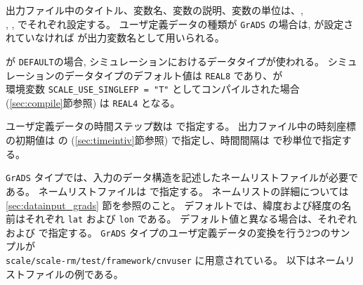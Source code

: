 出力ファイル中のタイトル、変数名、変数の説明、変数の単位は、, \\
, ,  でそれぞれ設定する。
ユーザ定義データの種類が \verb|GrADS| の場合は,  が設定されていなければ  が出力変数名として用いられる。

 が \verb|DEFAULT|の場合, シミュレーションにおけるデータタイプが使われる。
シミュレーションのデータタイプのデフォルト値は \verb|REAL8| であり、\scalerm が \\
環境変数 \verb|SCALE_USE_SINGLEFP = "T"| としてコンパイルされた場合 (\ref{sec:compile}節参照) は \verb|REAL4| となる。


ユーザ定義データの時間ステップ数は  で指定する。
出力ファイル中の時刻座標の初期値は  の  (\ref{sec:timeintiv}節参照) で指定し、時間間隔は  で秒単位で指定する。


\verb|GrADS| タイプでは、入力のデータ構造を記述したネームリストファイルが必要である。
ネームリストファイルは  で指定する。
ネームリストの詳細については \ref{sec:datainput_grads} 節を参照のこと。
デフォルトでは、緯度および経度の名前はそれぞれ \verb|lat| および \verb|lon| である。
デフォルト値と異なる場合は、それぞれ  および  で指定する。
\verb|GrADS| タイプのユーザ定義データの変換を行う2つのサンプルが \\
\verb|scale/scale-rm/test/framework/cnvuser| に用意されている。
以下はネームリストファイルの例である。



